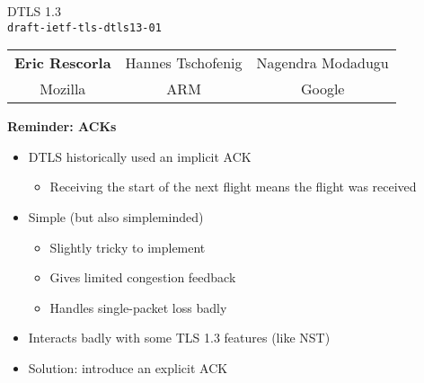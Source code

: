 \documentclass[helvetica]{seminar}
\newcommand{\heading}[1]{%
  \begin{center} 
    \large\bf 
    #1 
  \end{center} 
  \vspace{.4 in}}
\begin{document}
\begin{slide}
\begin{center}
\vspace{.5 in}
\LARGE{{\bf}DTLS 1.3\\{\small \verb^draft-ietf-tls-dtls13-01^}}\\
\vspace{.2in}
\large{
\begin{tabular}{c c c}
\textbf{Eric Rescorla} & Hannes Tschofenig & Nagendra Modadugu \\
Mozilla & ARM & Google \\
\end{tabular}
}
\end{center}
\end{slide}

\centerslidesfalse 

\begin{slide}
\heading{Reminder: ACKs}

\begin{itemize}
\item DTLS historically used an implicit ACK
  \begin{itemize}
  \item Receiving the start of the next flight means the flight was received
  \end{itemize}

\item Simple (but also simpleminded)
  \begin{itemize}
  \item Slightly tricky to implement
  \item Gives limited congestion feedback
  \item Handles single-packet loss badly
  \end{itemize}

\item Interacts badly with some TLS 1.3 features (like NST)
\item Solution: introduce an explicit ACK
\end{itemize}
\end{slide}
\end{document}
